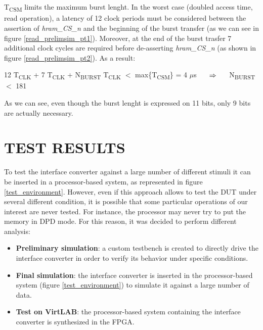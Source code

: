 \documentclass[10pt, english, a4paper, titlepage, oneside]{book}
\begin{document}
\\ \\
T\textsubscript{CSM} limits the maximum burst lenght. In the worst case (doubled access time, read operation), a latency of 12 clock periods must be considered between the assertion of \textit{hram\_CS\_n} and the beginning of the burst transfer (as we can see in figure \ref{read_prelimsim_pt1}). Moreover, at the end of the burst trasfer 7 additional clock cycles are required before de-asserting \textit{hram\_CS\_n} (as shown in figure \ref{read_prelimsim_pt2}). As a result:
\vspace{4mm}
\begin{center}
    12 T\textsubscript{CLK} + 7 T\textsubscript{CLK} + N\textsubscript{BURST} T\textsubscript{CLK} $<$ max\{T\textsubscript{CSM}\} = 4 $\mu$s $\hspace{5mm} \Rightarrow \hspace{5mm}$ N\textsubscript{BURST} $<$ 181
    \vspace{4mm}
\end{center}
As we can see, even though the burst lenght is expressed on 11 bits, only 9 bits are actually necessary.

\chapter{TEST RESULTS} \label{test result}
\noindent To test the interface converter against a large number of different stimuli it can be inserted in a processor-based system, as represented in figure \ref{test_environment}. However, even if this approach allows to test the \acrshort{DUT} under several different condition, it is possible that some particular operations of our interest are never tested. For instance, the processor may never try to put the memory in DPD mode. For this reason, it was decided to perform different analysis:
\vspace{2mm}
\begin{itemize}
    \item \textbf{Preliminary simulation}: a custom testbench is created to directly drive the interface converter in order to verify its behavior under specific conditions.
    \vspace{1mm}
    \item \textbf{Final simulation}: the interface converter is inserted in the processor-based system (figure \ref{test_environment}) to simulate it against a large number of data.
    \vspace{1mm}
    \item \textbf{Test on VirtLAB}: the processor-based system containing the interface converter is synthesized in the FPGA.
\end{itemize}
\vspace{4mm}
\end{document}
